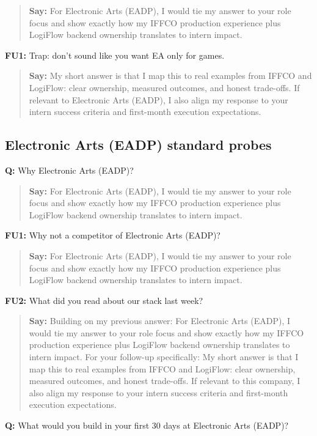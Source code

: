 \documentclass[9pt,a4paper]{article}
\begin{document}
\begin{quote}\small\textbf{Say:} For Electronic Arts (EADP), I would tie my answer to your role focus and show exactly how my IFFCO production experience plus LogiFlow backend ownership translates to intern impact.\end{quote}
\vspace{2mm}
\textbf{FU1:} Trap: don't sound like you want EA only for games.

\begin{quote}\small\textbf{Say:} My short answer is that I map this to real examples from IFFCO and LogiFlow: clear ownership, measured outcomes, and honest trade-offs. If relevant to Electronic Arts (EADP), I also align my response to your intern success criteria and first-month execution expectations.\end{quote}
\vspace{2mm}
\subsection{Electronic Arts (EADP) standard probes}
\textbf{Q:} Why Electronic Arts (EADP)?

\begin{quote}\small\textbf{Say:} For Electronic Arts (EADP), I would tie my answer to your role focus and show exactly how my IFFCO production experience plus LogiFlow backend ownership translates to intern impact.\end{quote}
\vspace{2mm}
\textbf{FU1:} Why not a competitor of Electronic Arts (EADP)?

\begin{quote}\small\textbf{Say:} For Electronic Arts (EADP), I would tie my answer to your role focus and show exactly how my IFFCO production experience plus LogiFlow backend ownership translates to intern impact.\end{quote}
\vspace{2mm}
\textbf{FU2:} What did you read about our stack last week?

\begin{quote}\small\textbf{Say:} Building on my previous answer: For Electronic Arts (EADP), I would tie my answer to your role focus and show exactly how my IFFCO production experience plus LogiFlow backend ownership translates to intern impact. For your follow-up specifically: My short answer is that I map this to real examples from IFFCO and LogiFlow: clear ownership, measured outcomes, and honest trade-offs. If relevant to this company, I also align my response to your intern success criteria and first-month execution expectations.\end{quote}
\vspace{2mm}
\textbf{Q:} What would you build in your first 30 days at Electronic Arts (EADP)?
\end{document}
